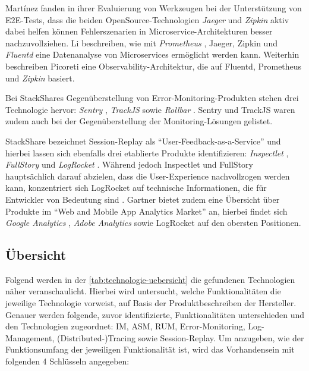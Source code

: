 Mart{\'i}nez \etal \cite{ComparisonOfE2ETestingToolsForMicroservices} fanden in ihrer Evaluierung von Werkzeugen bei der Unterstützung von E2E-Tests, dass die beiden OpenSource-Technologien \textit{Jaeger} \cite{Jaeger} und \textit{Zipkin} \cite{Zipkin} aktiv dabei helfen können Fehlerszenarien in Microservice-Architekturen besser nachzuvollziehen. Li \etal \cite{ServiceMeshChallengesStateOfTheArt} beschreiben, wie mit \textit{Prometheus} \cite{Prometheus}, Jaeger, Zipkin und \textit{Fluentd} \cite{Fluentd} eine Datenanalyse von Microservices ermöglicht werden kann. Weiterhin beschreiben Picoreti \etal \cite{MultilevelObservabilityInCloudOrchestration} eine Observability-Architektur, die auf Fluentd, Prometheus und \textit{Zipkin} basiert.

Bei StackShares Gegenüberstellung von Error-Monitoring-Produkten \cite{StackShareExceptionMonitoring} stehen drei Technologie hervor: \textit{Sentry} \cite{Sentry}, \textit{TrackJS} \cite{TrackJS} sowie \textit{Rollbar} \cite{Rollbar}. Sentry und TrackJS waren zudem auch bei der Gegenüberstellung der Monitoring-Lösungen \cite{StackShareMonitoring} gelistet.

StackShare bezeichnet Session-Replay als \enquote{User-Feedback-as-a-Service} und hierbei \cite{StackShareUserFeedbackAsAService} lassen sich ebenfalls drei etablierte Produkte identifizieren: \textit{Inspectlet} \cite{Inspectlet}, \textit{FullStory} \cite{FullStory} und \textit{LogRocket} \cite{LogRocket}. Während jedoch Inspectlet und FullStory hauptsächlich darauf abzielen, dass die User-Experience nachvollzogen werden kann, konzentriert sich LogRocket auf technische Informationen, die für Entwickler von Bedeutung sind \cite{Webalyt}. Gartner bietet zudem eine Übersicht \cite{GartnerWebAndMobileAppAnalytics} über Produkte im \enquote{Web and Mobile App Analytics Market} an, hierbei findet sich \textit{Google Analytics} \cite{GoogleAnalytics}, \textit{Adobe Analytics} \cite{AdobeAnalytics} sowie LogRocket auf den obersten Positionen.

\subsection{Übersicht}

Folgend werden in der \autoref{tab:technologie-uebersicht} die gefundenen Technologien näher veranschaulicht. Hierbei wird untersucht, welche Funktionalitäten die jeweilige Technologie vorweist, auf Basis der Produktbeschreiben der Hersteller. Genauer werden folgende, zuvor identifizierte, Funktionalitäten unterschieden und den Technologien zugeordnet: IM, ASM, RUM, Error-Monitoring, Log-Management, (Distributed-)Tracing sowie Session-Replay. Um anzugeben, wie der Funktionsumfang der jeweiligen Funktionalität ist, wird das Vorhandensein mit folgenden 4 Schlüsseln angegeben:

